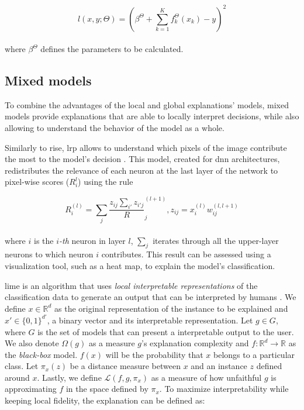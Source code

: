 \begin{equation}
l(x,y;\Theta) = (\beta^\Theta +  \sum_{k=1}^K f_k^\Theta(x_k) - y)^2
\end{equation}
\\
where $\beta^\Theta$ defines the parameters to be calculated. 


\subsection{Mixed models}

To combine the advantages of the local and global explanations' models, mixed models provide explanations that are able to locally interpret decisions, while also allowing to understand the behavior of the model as a whole.

Similarly to  \gls{rise}, \gls{lrp} allows to understand which pixels of the image contribute the most to the model's decision \cite{LRP}. This model, created for \gls{dnn} architectures, redistributes the relevance of each neuron at the last layer of the network to pixel-wise scores ($R_{i}^{l}$) using the rule

\begin{equation}
R_i^{(l)} = \sum_j \dfrac{z_{ij}{\sum_{i'} z_{i'j}}} R_{j}^{(l+1)} , z_{ij} = x_i^{(l)}w_{ij}^{(l,l+1)}
\end{equation}
\\
where $i$ is the $i$\textit{-th} neuron in layer $l$, $\sum_j$ iterates through all the upper-layer neurons to which neuron $i$ contributes. This result can be assessed using a visualization tool, such as a heat map, to explain the model's classification.

\gls{lime} is an algorithm that uses \textit{local interpretable representations} of the classification data to generate an output that can be interpreted by humans \cite{LIME}. 
We define $x \in \mathbb{R}^d$ as the original representation of the instance to be explained and $x' \in \{0,1\}^{d'}$, a binary vector and its interpretable representation. Let $g \in G$, where $G$ is the set of models that can present a interpretable output to the user. We also denote $\Omega(g)$ as a measure $g$'s explanation complexity and $ f: \mathbb{R}^d \rightarrow \mathbb{R}$ as the \textit{black-box} model. $f(x)$ will be the probability that $x$ belongs to a particular class. Let $\pi_x(z)$ be a distance measure between $x$ and an instance $z$ defined around $x$. Lastly, we define $\mathcal{L}(f,g,\pi_x)$ as a measure of how unfaithful $g$ is approximating $f$ in the space defined by $\pi_x$. To maximize interpretability while keeping local fidelity, the explanation can be defined as:

